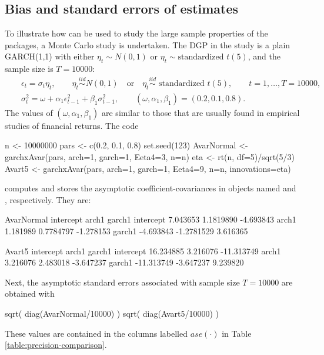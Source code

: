 \subsection{Bias and standard errors of estimates}

To illustrate how  can be used to study the large sample properties of the packages, a Monte Carlo study is undertaken. The DGP in the study is a plain GARCH(1,1) with either $\eta_t \sim N(0,1)$ or $\eta_t \sim \text{standardized } t(5)$, and the sample size is $T=10000$:
%
\begin{eqnarray}
	&& \epsilon_t = \sigma_t\eta_t, \qquad \eta_t \overset{iid}{\sim} N(0,1) \quad\text{or}\quad \eta_t\overset{iid}{\sim} \text{ standardized } t(5), \qquad t=1,\ldots, T=10000, \nonumber\\[2mm]
	&& \sigma_t^2 = \omega + \alpha_1\epsilon_{t-1}^2 + \beta_1\sigma_{t-1}^2, \qquad (\omega, \alpha_1, \beta_1) = (0.2, 0.1, 0.8). \nonumber
\end{eqnarray}
%
The values of $(\omega, \alpha_1, \beta_1)$ are similar to those that are usually found in empirical studies of financial returns. The code
%
\begin{example}
	n <- 10000000
	pars <- c(0.2, 0.1, 0.8)
	set.seed(123)
	AvarNormal <- garchxAvar(pars, arch=1, garch=1, Eeta4=3, n=n)
	eta <- rt(n, df=5)/sqrt(5/3)
	Avart5 <- garchxAvar(pars, arch=1, garch=1, Eeta4=9, n=n,
		innovations=eta)
\end{example}
%
computes and stores the asymptotic coefficient-covariances in objects named  and , respectively. They are:
%
\begin{example}
	AvarNormal
	          intercept      arch1    garch1
	intercept  7.043653  1.1819890 -4.693843
	arch1      1.181989  0.7784797 -1.278153
	garch1    -4.693843 -1.2781529  3.616365

	Avart5
	           intercept     arch1     garch1
	intercept  16.234885  3.216076 -11.313749
	arch1       3.216076  2.483018  -3.647237
	garch1    -11.313749 -3.647237   9.239820
\end{example}
%
Next, the asymptotic standard errors associated with sample size $T=10000$ are obtained with
%
\begin{example}
	sqrt( diag(AvarNormal/10000) )
	sqrt( diag(Avart5/10000) )
\end{example}
%
These values are contained in the columns labelled $ase(\cdot)$ in Table \ref{table:precision-comparison}.

